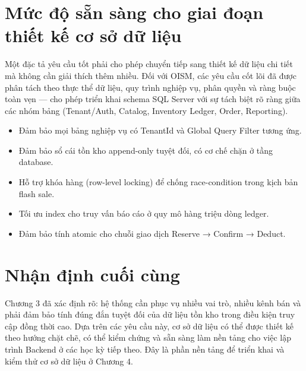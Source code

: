 \section{Mức độ sẵn sàng cho giai đoạn thiết kế cơ sở dữ liệu}

Một đặc tả yêu cầu tốt phải cho phép chuyển tiếp sang thiết kế dữ liệu chi tiết mà không cần giải thích thêm nhiều. Đối với OISM, các yêu cầu cốt lõi đã được phân tách theo thực thể dữ liệu, quy trình nghiệp vụ, phân quyền và ràng buộc toàn vẹn — cho phép triển khai schema SQL Server với sự tách biệt rõ ràng giữa các nhóm bảng (Tenant/Auth, Catalog, Inventory Ledger, Order, Reporting).

\begin{itemize}
    \item Đảm bảo mọi bảng nghiệp vụ có TenantId và Global Query Filter tương ứng.
    \item Đảm bảo sổ cái tồn kho append-only tuyệt đối, có cơ chế chặn ở tầng database.
    \item Hỗ trợ khóa hàng (row-level locking) để chống race-condition trong kịch bản flash sale.
    \item Tối ưu index cho truy vấn báo cáo ở quy mô hàng triệu dòng ledger.
    \item Đảm bảo tính atomic cho chuỗi giao dịch Reserve → Confirm → Deduct.
\end{itemize}

\section{Nhận định cuối cùng}

Chương 3 đã xác định rõ: hệ thống cần phục vụ nhiều vai trò, nhiều kênh bán và phải đảm bảo tính đúng đắn tuyệt đối của dữ liệu tồn kho trong điều kiện truy cập đồng thời cao. Dựa trên các yêu cầu này, cơ sở dữ liệu có thể được thiết kế theo hướng chặt chẽ, có thể kiểm chứng và sẵn sàng làm nền tảng cho việc lập trình Backend ở các học kỳ tiếp theo. Đây là phần nền tảng để triển khai và kiểm thử cơ sở dữ liệu ở Chương 4.
